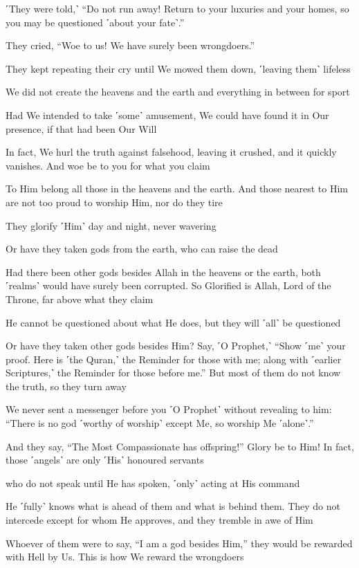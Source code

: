 ˹They were told,˺ “Do not run away! Return to your luxuries and your homes, so you may be questioned ˹about your fate˺.”

They cried, “Woe to us! We have surely been wrongdoers.”

They kept repeating their cry until We mowed them down, ˹leaving them˺ lifeless

We did not create the heavens and the earth and everything in between for sport

Had We intended to take ˹some˺ amusement, We could have found it in Our presence, if that had been Our Will

In fact, We hurl the truth against falsehood, leaving it crushed, and it quickly vanishes. And woe be to you for what you claim

To Him belong all those in the heavens and the earth. And those nearest to Him are not too proud to worship Him, nor do they tire

They glorify ˹Him˺ day and night, never wavering

Or have they taken gods from the earth, who can raise the dead

Had there been other gods besides Allah in the heavens or the earth, both ˹realms˺ would have surely been corrupted. So Glorified is Allah, Lord of the Throne, far above what they claim

He cannot be questioned about what He does, but they will ˹all˺ be questioned

Or have they taken other gods besides Him? Say, ˹O Prophet,˺ “Show ˹me˺ your proof. Here is ˹the Quran,˺ the Reminder for those with me; along with ˹earlier Scriptures,˺ the Reminder for those before me.” But most of them do not know the truth, so they turn away

We never sent a messenger before you ˹O Prophet˺ without revealing to him: “There is no god ˹worthy of worship˺ except Me, so worship Me ˹alone˺.”

And they say, “The Most Compassionate has offspring!” Glory be to Him! In fact, those ˹angels˺ are only ˹His˺ honoured servants

who do not speak until He has spoken, ˹only˺ acting at His command

He ˹fully˺ knows what is ahead of them and what is behind them. They do not intercede except for whom He approves, and they tremble in awe of Him

Whoever of them were to say, “I am a god besides Him,” they would be rewarded with Hell by Us. This is how We reward the wrongdoers

